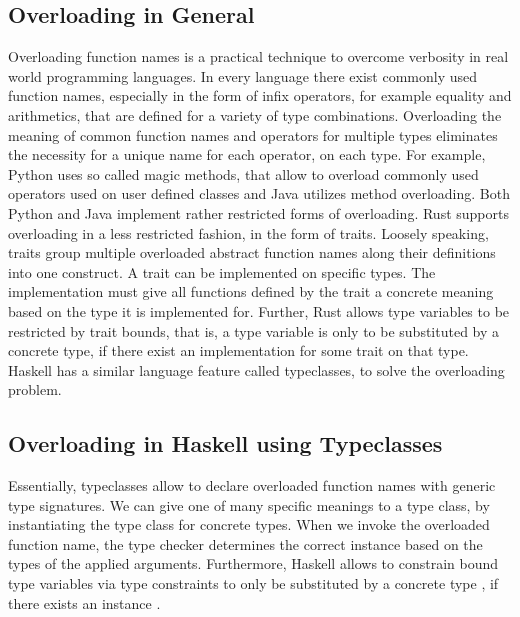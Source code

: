 \subsection{Overloading in General}
Overloading function names is a practical technique to overcome verbosity in real world programming languages. In every language there exist commonly used function names, especially in the form of infix operators, for example equality and arithmetics, that are defined for a variety of type combinations. Overloading the meaning of common function names and operators for multiple types eliminates the necessity for a unique name for each operator, on each type. 
For example, Python uses so called magic methods, that allow to overload commonly used operators used on user defined classes and Java utilizes method overloading. Both Python and Java implement rather restricted forms of overloading. Rust supports overloading in a less restricted fashion, in the form of traits. Loosely speaking, traits group multiple overloaded abstract function names along their definitions into one construct. A trait can be implemented on specific types. The implementation must give all functions defined by the trait a concrete meaning based on the type it is implemented for. Further, Rust allows type variables to be restricted by trait bounds, that is, a type variable is only to be substituted by a concrete type, if there exist an implementation for some trait on that type. Haskell has a similar language feature called typeclasses, to solve the overloading problem.

\subsection{Overloading in Haskell using Typeclasses}
Essentially, typeclasses allow to declare overloaded function names with generic type signatures.
We can give one of many specific meanings to a type class, by instantiating the type class for concrete types.
When we invoke the overloaded function name, the type checker determines the correct instance based on the types of the applied arguments. 
Furthermore, Haskell allows to constrain bound type variables  via type constraints  to only be substituted by a concrete type , if there exists an instance  .

